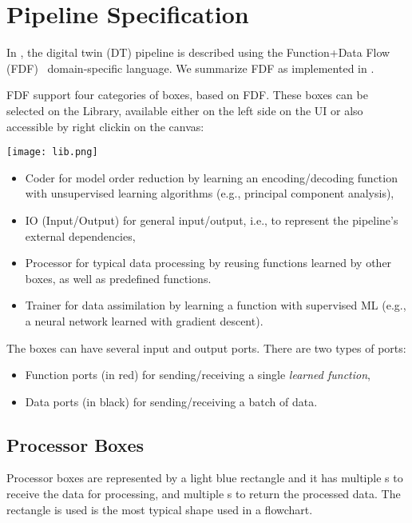 
\section{Pipeline Specification}

In {\Builder}, the digital twin (DT) pipeline is described using the Function+Data Flow (FDF)~\cite{decontoFunction+DataFlowFramework2024} domain-specific language. We summarize FDF as implemented in {\Builder}. 

FDF support four categories of boxes, based on FDF. These boxes can be selected on the Library, available either on the left side on the UI or also accessible by right clickin on the canvas:

\texttt{[image: lib.png]}

\begin{itemize}
    \item Coder for model order reduction by learning an encoding/decoding function
    with unsupervised learning algorithms (e.g., principal component analysis),
    \item IO (Input/Output) for general input/output, i.e., to represent the pipeline's external dependencies, 
    \item Processor for typical data processing by reusing functions learned by other
    boxes, as well as predefined functions.
    \item Trainer for data assimilation by learning a function with supervised ML (e.g.,
    a neural network learned with gradient descent).
\end{itemize}

The boxes can have several input and output ports. There are two types of ports:
\begin{itemize}
    \item Function ports (in {\color{red}red}) for sending/receiving a single {\em learned function},
    \item Data ports (in black) for sending/receiving a batch of data. 
\end{itemize}

\subsection{Processor Boxes}

Processor boxes are represented by a light blue rectangle and it has multiple \IDP s to receive the data for processing, and multiple \ODP s to return the processed data. 
The rectangle is used is the most typical shape used in a flowchart. 

